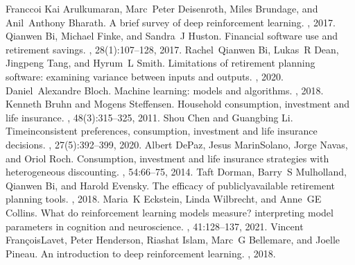 \documentclass[letterpaper,10pt,english]{jupyterBook}
\begin{document}
\begin{sphinxthebibliography}{Franccoi}
\sphinxAtStartPar
Kai Arulkumaran, Marc Peter Deisenroth, Miles Brundage, and Anil Anthony Bharath. A brief survey of deep reinforcement learning. , 2017.
\sphinxAtStartPar
Qianwen Bi, Michael Finke, and Sandra J Huston. Financial software use and retirement savings. , 28(1):107–128, 2017.
\sphinxAtStartPar
Rachel Qianwen Bi, Lukas R Dean, Jingpeng Tang, and Hyrum L Smith. Limitations of retirement planning software: examining variance between inputs and outputs. , 2020.
\sphinxAtStartPar
Daniel Alexandre Bloch. Machine learning: models and algorithms. , 2018.
\sphinxAtStartPar
Kenneth Bruhn and Mogens Steffensen. Household consumption, investment and life insurance. , 48(3):315–325, 2011.
\sphinxAtStartPar
Shou Chen and Guangbing Li. Time\sphinxhyphen{}inconsistent preferences, consumption, investment and life insurance decisions. , 27(5):392–399, 2020.
\sphinxAtStartPar
Albert De\sphinxhyphen{}Paz, Jesus Marin\sphinxhyphen{}Solano, Jorge Navas, and Oriol Roch. Consumption, investment and life insurance strategies with heterogeneous discounting. , 54:66–75, 2014.
\sphinxAtStartPar
Taft Dorman, Barry S Mulholland, Qianwen Bi, and Harold Evensky. The efficacy of publicly\sphinxhyphen{}available retirement planning tools. , 2018.
\sphinxAtStartPar
Maria K Eckstein, Linda Wilbrecht, and Anne GE Collins. What do reinforcement learning models measure? interpreting model parameters in cognition and neuroscience. , 41:128–137, 2021.
\sphinxAtStartPar
Vincent François\sphinxhyphen{}Lavet, Peter Henderson, Riashat Islam, Marc G Bellemare, and Joelle Pineau. An introduction to deep reinforcement learning. , 2018.

\end{sphinxthebibliography}
\end{document}
